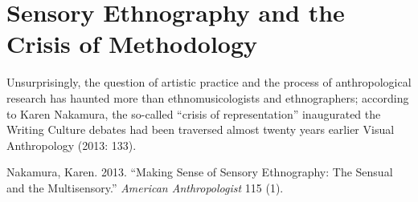 \hypertarget{sensory-ethnography-and-the-crisis-of-methodology}{%
\section{Sensory Ethnography and the Crisis of
Methodology}\label{sensory-ethnography-and-the-crisis-of-methodology}}

Unsurprisingly, the question of artistic practice and the process of
anthropological research has haunted more than ethnomusicologists and
ethnographers; according to Karen Nakamura, the so-called ``crisis of
representation'' inaugurated the Writing Culture debates had been
traversed almost twenty years earlier Visual Anthropology (2013: 133).

\hypertarget{refs}{}
\begin{cslreferences}
\leavevmode\hypertarget{ref-nakamura_making_2013}{}%
Nakamura, Karen. 2013. ``Making Sense of Sensory Ethnography: The
Sensual and the Multisensory.'' \emph{American Anthropologist} 115 (1).
\end{cslreferences}

